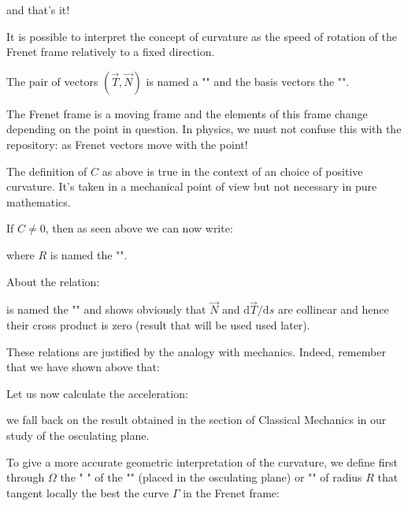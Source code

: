 {	and that's it!
	
	It is possible to interpret the concept of curvature as the speed of rotation of the Frenet frame relatively to a fixed direction.
	
	The pair of vectors $(\vec{T}, \vec{N})$ is named a "" and the basis vectors the "".
	
	The Frenet frame is a moving frame and the elements of this frame change depending on the point in question. In physics, we must not confuse this with the repository: as Frenet vectors move with the point!
	
	\begin{tcolorbox}[title=Remark,colframe=black,arc=10pt]
	The definition of $C$ as above is true in the context of an choice of positive curvature. It's taken in a mechanical point of view but not necessary in pure mathematics.
	\end{tcolorbox}	
	If $C\neq 0$, then as seen above we can now write:
	
	where $R$ is named the "\label{curvature radius}".
	
	About the relation:
	
	is named the "\label{first Frenet formula}" and shows obviously that $\vec{N}$ and $\mathrm{d}\vec{T}/\mathrm{d}s$ are collinear and hence their cross product is zero (result that will be used used later).
	
	These relations are justified by the analogy with mechanics. Indeed, remember that we have shown above that:
	
	
	Let us now calculate the acceleration:
	
	we fall back on the result obtained in the section of Classical Mechanics in our study of the osculating plane.
	
	To give a more accurate geometric interpretation of the curvature, we define first through $\Omega$ the " \label{center of curvature}" of the "" (placed in the osculating plane) or "" of radius $R$ that tangent locally the best the curve $\Gamma$ in the Frenet frame:
	
}

